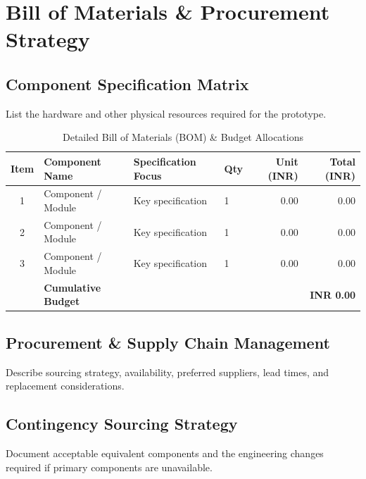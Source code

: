 
\section{Bill of Materials \& Procurement Strategy}

\subsection{Component Specification Matrix}

List the hardware and other physical resources required for the prototype.

\begin{table}[!htbp]
    \centering
    \small
    \renewcommand{\arraystretch}{1.3}
    \begin{tabular}{clllrr}
        \toprule
        \textbf{Item} &
        \textbf{Component Name} &
        \textbf{Specification Focus} &
        \textbf{Qty} &
        \textbf{Unit (INR)} &
        \textbf{Total (INR)} \\
        \midrule
        1 & Component / Module & Key specification & 1 & 0.00 & 0.00 \\
        2 & Component / Module & Key specification & 1 & 0.00 & 0.00 \\
        3 & Component / Module & Key specification & 1 & 0.00 & 0.00 \\
        \midrule
        & \textbf{Cumulative Budget} & & & &
        \textbf{INR 0.00} \\
        \bottomrule
    \end{tabular}
    \caption{Detailed Bill of Materials (BOM) \& Budget Allocations}
\end{table}

\subsection{Procurement \& Supply Chain Management}

Describe sourcing strategy, availability, preferred suppliers, lead times,
and replacement considerations.

\subsection{Contingency Sourcing Strategy}

Document acceptable equivalent components and the engineering changes required
if primary components are unavailable.
